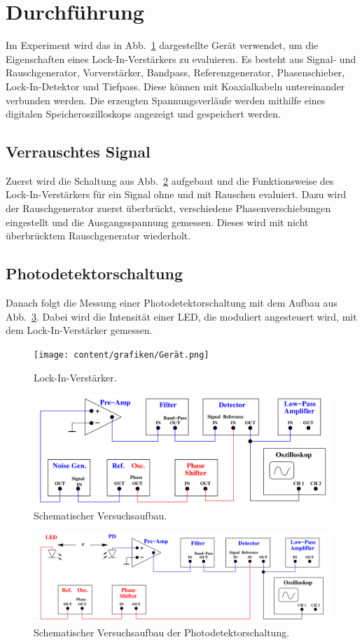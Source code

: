 \section{Durchführung}
\label{sec:Durchführung}

Im Experiment wird das in Abb.~\ref{fig:lockin} dargestellte Gerät verwendet, um die Eigenschaften eines Lock-In-Verstärkers zu evaluieren. Es besteht aus Signal- und Rauschgenerator, Vorverstärker, Bandpass, Referenzgenerator, Phasenschieber, Lock-In-Detektor und Tiefpass. Diese können mit Koaxialkabeln untereinander verbunden werden. Die erzeugten Spannungsverläufe werden mithilfe eines digitalen Speicheroszilloskops angezeigt und gespeichert werden.

\subsection{Verrauschtes Signal}
Zuerst wird die Schaltung aus Abb.~\ref{fig:aufbau} aufgebaut und die Funktionsweise des Lock-In-Verstärkers für ein Signal ohne und mit Rauschen evaluiert. Dazu wird der Rauschgenerator zuerst überbrückt, verschiedene Phasenverschiebungen eingestellt und die Ausgangsspannung gemessen. Dieses wird mit nicht überbrücktem Rauschgenerator wiederholt.

\subsection{Photodetektorschaltung}
Danach folgt die Messung einer Photodetektorschaltung mit dem Aufbau aus Abb.~\ref{fig:aufbau2}. Dabei wird die Intensität einer LED, die moduliert angesteuert wird, mit dem Lock-In-Verstärker gemessen.

\begin{figure}
  \centering
  \texttt{[image: content/grafiken/Gerät.png]}
  \caption{Lock-In-Verstärker.}
  \label{fig:lockin}
\end{figure}

\begin{figure}
  \centering
  \includegraphics[width=\textwidth]{content/grafiken/Aufbau.png}
  \caption{Schematischer Versuchsaufbau.}
  \label{fig:aufbau}
\end{figure}

\begin{figure}
  \centering
  \includegraphics[width=\textwidth]{content/grafiken/Aufbau2.png}
  \caption{Schematischer Versuchsaufbau der Photodetektorschaltung.}
  \label{fig:aufbau2}
\end{figure}
